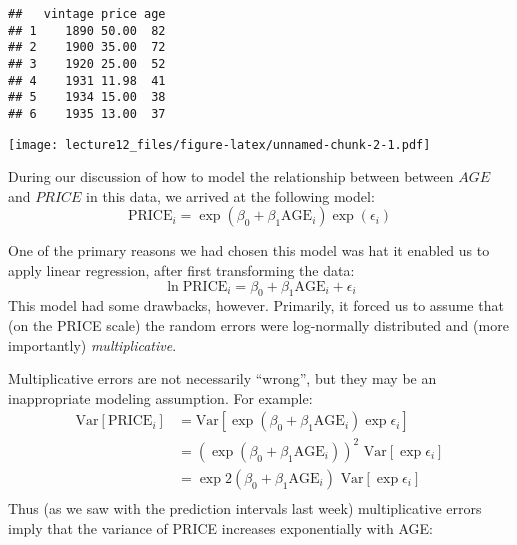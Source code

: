 \documentclass[
]{article}
\newenvironment{Shaded}{\begin{snugshade}}{\end{snugshade}}
\newcommand{\FunctionTok}[1]{\textcolor[rgb]{0.00,0.00,0.00}{#1}}
\newcommand{\NormalTok}[1]{#1}
\newcommand{\SpecialCharTok}[1]{\textcolor[rgb]{0.00,0.00,0.00}{#1}}
\begin{document}
\begin{verbatim}
##   vintage price age
## 1    1890 50.00  82
## 2    1900 35.00  72
## 3    1920 25.00  52
## 4    1931 11.98  41
## 5    1934 15.00  38
## 6    1935 13.00  37
\end{verbatim}

\begin{Shaded}
\end{Shaded}

\texttt{[image: lecture12\_files/figure-latex/unnamed-chunk-2-1.pdf]}

During our discussion of how to model the relationship between between
\(AGE\) and \(PRICE\) in this data, we arrived at the following model:
\[
\text{PRICE}_i = \exp{(\beta_0 + \beta_1 \text{AGE}_i)} \exp(\epsilon_i)
\]

One of the primary reasons we had chosen this model was hat it enabled
us to apply linear regression, after first transforming the data: \[
\ln{\text{PRICE}_i} = \beta_0 + \beta_1 \text{AGE}_i + \epsilon_i
\] This model had some drawbacks, however. Primarily, it forced us to
assume that (on the PRICE scale) the random errors were log-normally
distributed and (more importantly) \emph{multiplicative}.

Multiplicative errors are not necessarily ``wrong'', but they may be an
inappropriate modeling assumption. For example: \[
\begin{split}
\text{Var}[\text{PRICE}_i] &= \text{Var}\left[ \exp{ \left( \beta_0 + \beta_1 \text{AGE}_i \right)} \exp{\epsilon}_i  \right]\\
&= (\exp{ \left( \beta_0 + \beta_1 \text{AGE}_i \right)})^2 \text{ Var}\left[  \exp{\epsilon}_i  \right]\\
&= \exp{ 2\left( \beta_0 + \beta_1 \text{AGE}_i \right)} \text{ Var}\left[  \exp{\epsilon}_i  \right]\\
\end{split}
\] Thus (as we saw with the prediction intervals last week)
multiplicative errors imply that the variance of PRICE increases
exponentially with AGE:
\end{document}
